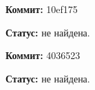 \textbf{Коммит:} 10ef175


\textbf{Статус:} не найдена.

\vspace{1cm}

\textbf{Коммит:} 4036523


\textbf{Статус:} не найдена.



